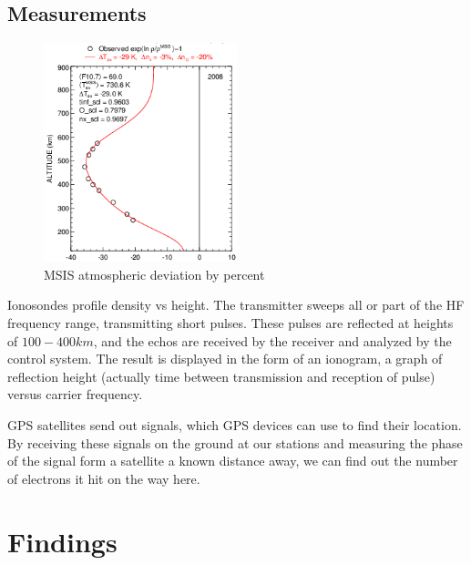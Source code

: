 \documentclass[12pt]{article}
\begin{document}
\subsection{Measurements}
  \begin{figure}
    \includegraphics[height=2.5in]{cropped}
    \caption{MSIS atmospheric deviation by percent}
  \end{figure}

Ionosondes profile density vs height.
      The transmitter sweeps all or part of the HF frequency range, transmitting short pulses. These pulses are reflected at heights of $100-400 km$, and the echos are received by the receiver and analyzed by the control system. The result is displayed in the form of an ionogram, a graph of reflection height (actually time between transmission and reception of pulse) versus carrier frequency.
    
      GPS satellites send out signals, which GPS devices can use to find their location.
    By receiving these signals on the ground at our stations and measuring the phase of the signal form a satellite a known distance away, we can find out the number of electrons it hit on the way here. 
\section{Findings} 
\end{document}
